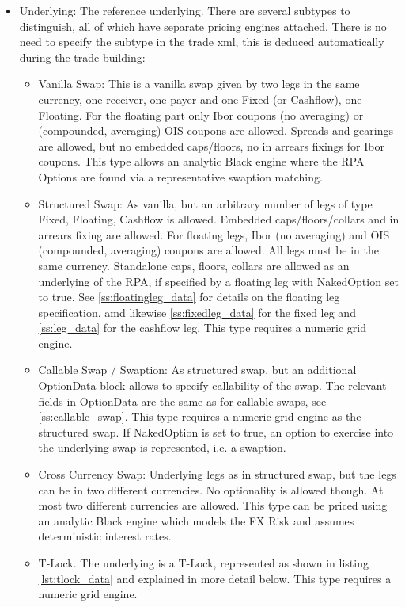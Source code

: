 \begin{itemize}
\item Underlying: The reference underlying. There are several subtypes to distinguish, all of which have separate
  pricing engines attached. There is no need to specify the subtype in the trade xml, this is deduced automatically
  during the trade building:
  \begin{itemize}
  \item Vanilla Swap: This is a vanilla swap given by two legs in the same currency, one receiver, one payer and one
    Fixed (or Cashflow), one Floating. For the floating part only Ibor coupons (no averaging) or (compounded, averaging)
    OIS coupons are allowed. Spreads and gearings are allowed, but no embedded caps/floors, no in arrears fixings for
    Ibor coupons. This type allows an analytic Black engine where the RPA Options are found via a representative
    swaption matching.
  \item Structured Swap: As vanilla, but an arbitrary number of legs of type Fixed, Floating, Cashflow is
    allowed. Embedded caps/floors/collars and in arrears fixing are allowed. For floating legs, Ibor (no averaging) and
    OIS (compounded, averaging) coupons are allowed. All legs must be in the same currency. Standalone caps, floors,
    collars are allowed as an underlying of the RPA, if specified by a floating leg with NakedOption set to true. See
    \ref{ss:floatingleg_data} for details on the floating leg specification, amd likewise \ref{ss:fixedleg_data} for the
    fixed leg and \ref{ss:leg_data} for the cashflow leg. This type requires a numeric grid engine.
  \item Callable Swap / Swaption: As structured swap, but an additional OptionData block allows to specify callability
    of the swap. The relevant fields in OptionData are the same as for callable swaps, see \ref{ss:callable_swap}. This
    type requires a numeric grid engine as the structured swap. If NakedOption is set to true, an option to exercise
    into the underlying swap is represented, i.e. a swaption.
  \item Cross Currency Swap: Underlying legs as in structured swap, but the legs can be in two different currencies. No
    optionality is allowed though. At most two different currencies are allowed. This type can be priced using an
    analytic Black engine which models the FX Risk and assumes deterministic interest rates.
  \item T-Lock. The underlying is a T-Lock, represented as shown in listing \ref{lst:tlock_data} and explained in more
    detail below. This type requires a numeric grid engine.
  \end{itemize}
\end{itemize}

